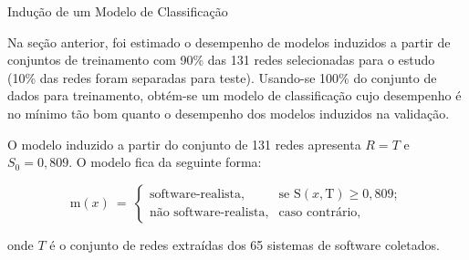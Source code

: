 \begin{section}{Indução de um Modelo de Classificação} \label{cap:clas4}
	
	Na seção anterior, foi estimado o desempenho de modelos induzidos a partir de conjuntos de treinamento com 90\% das 131 redes selecionadas para o estudo (10\% das redes foram separadas para teste). Usando-se 100\% do conjunto de dados para treinamento, obtém-se um modelo de classificação cujo desempenho é no mínimo tão bom quanto o desempenho dos modelos induzidos na validação.
	
	O modelo induzido a partir do conjunto de 131 redes apresenta $R = T$ e $S_0 = 0,809$. O modelo fica da seguinte forma:
	
	$$
	\mathrm{m}(x) ~=~
	\left\{
	\begin{array}{cl}
	\mbox{software-realista,} & \mbox{se } \mathrm{S}(x, \mbox{T}) \ge 0,809; \\
	\mbox{não software-realista,} & \mbox{caso contrário,}
	\end{array}
	\right.
	$$

	onde $T$ é o conjunto de redes extraídas dos 65 sistemas de software coletados.
		
	
	
\end{section}

